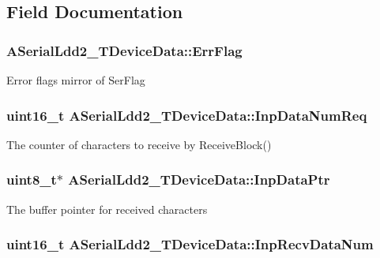 \subsection{Field Documentation}
\hypertarget{struct_a_serial_ldd2___t_device_data_a1021f1662a4bc2bc7a9320dc212926e0}{
\subsubsection[{Err\-Flag}]{ A\-Serial\-Ldd2\-\_\-\-T\-Device\-Data\-::\-Err\-Flag}}\label{struct_a_serial_ldd2___t_device_data_a1021f1662a4bc2bc7a9320dc212926e0}
Error flags mirror of Ser\-Flag \hypertarget{struct_a_serial_ldd2___t_device_data_ae6ceada79f32288b9d488088ea56bf36}{
\subsubsection[{Inp\-Data\-Num\-Req}]{\setlength{\rightskip}{0pt plus 5cm}uint16\-\_\-t A\-Serial\-Ldd2\-\_\-\-T\-Device\-Data\-::\-Inp\-Data\-Num\-Req}}\label{struct_a_serial_ldd2___t_device_data_ae6ceada79f32288b9d488088ea56bf36}
The counter of characters to receive by Receive\-Block() \hypertarget{struct_a_serial_ldd2___t_device_data_ae7d8edc8b9d60f3b627bc0549585de6c}{
\subsubsection[{Inp\-Data\-Ptr}]{\setlength{\rightskip}{0pt plus 5cm}uint8\-\_\-t$\ast$ A\-Serial\-Ldd2\-\_\-\-T\-Device\-Data\-::\-Inp\-Data\-Ptr}}\label{struct_a_serial_ldd2___t_device_data_ae7d8edc8b9d60f3b627bc0549585de6c}
The buffer pointer for received characters \hypertarget{struct_a_serial_ldd2___t_device_data_a551da007a82d4fd4e26ea72007112f46}{
\subsubsection[{Inp\-Recv\-Data\-Num}]{\setlength{\rightskip}{0pt plus 5cm}uint16\-\_\-t A\-Serial\-Ldd2\-\_\-\-T\-Device\-Data\-::\-Inp\-Recv\-Data\-Num}}\label{struct_a_serial_ldd2___t_device_data_a551da007a82d4fd4e26ea72007112f46}

